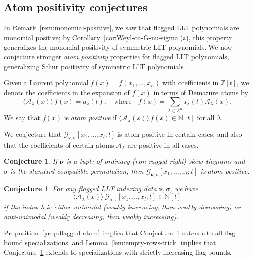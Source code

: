 \documentclass[12pt]{amsart}
\newtheorem{conj}[thm]{Conjecture}
\theoremstyle{definition}
\theoremstyle{remark}
\newcommand{\NN}{{\mathbb N}}
\newcommand{\ZZ}{{\mathbb Z}}
\newcommand{\nubold}{{\boldsymbol \nu }}
\newcommand{\Acal}{{\mathcal A}}
\newcommand{\Gcal}{{\mathcal G}}
\begin{document}
\subsection{Atom positivity conjectures}
\label{ss:atom-positivity}

In Remark~\ref{rem:monomial-positive}, we saw that flagged LLT
polynomials are monomial positive; by
Corollary~\ref{cor:Weyl-on-G-nu-sigma}(a), this property generalizes
the monomial positivity of symmetric LLT polynomials.  We now
conjecture stronger {\em atom positivity} properties for flagged LLT
polynomials, generalizing Schur positivity of symmetric LLT
polynomials.

Given a Laurent polynomial $f(x) = f(x_{1},\ldots,x_{n})$ with
coefficients in $\ZZ [t]$, we denote the coefficients in the expansion
of $f(x)$ in terms of Demazure atoms by
\begin{equation}\label{e:atom-expansion}
\langle \Acal _{\lambda }(x) \rangle\, f(x) = a_{\lambda }(t),\quad
\text{where}\quad f(x)= \sum_{\lambda \in \ZZ^{n}} a_{\lambda}(t)
\Acal_\lambda(x).
\end{equation}
We say that $f(x)$ is {\em atom positive} if $\langle \Acal _{\lambda
}(x) \rangle\, f(x)\in \NN [t]$ for all $\lambda $.

We conjecture that $\Gcal _{\nubold ,\sigma }[x_{1},\ldots,x_{l};t]$
is atom positive in certain cases, and also that the coefficients of
certain atoms $\Acal _{\lambda }$ are positive in all cases.

\begin{conj}\label{conj:atom-pos-standard}
If $\nubold $ is a tuple of ordinary (non-ragged-right) skew diagrams
and $\sigma $ is the standard compatible permutation, then
$\Gcal_{\nubold, \sigma}[x_1, \dots, x_l;t]$ is atom positive.
\end{conj}

\begin{conj}\label{conj:atom-pos-unimodal}
For any flagged LLT indexing data $\nubold ,\sigma $, we have
\begin{equation}\label{e:atom-pos-unimodal}
\langle \Acal _{\lambda }(x) \rangle\, \Gcal_{\nubold, \sigma}[x_1,
\dots, x_l;t] \in \NN [t]
\end{equation}
if the index $\lambda $ is either unimodal (weakly increasing, then
weakly decreasing) or anti-unimodal (weakly decreasing, then weakly
increasing).
\end{conj}

Proposition~\ref{prop:flagged-atom} implies that
Conjecture~\ref{conj:atom-pos-standard} extends to all flag bound
specializations, and Lemma~\ref{lem:empty-rows-trick} implies that
Conjecture~\ref{conj:atom-pos-unimodal} extends to specializations
with strictly increasing flag bounds.
\end{document}
